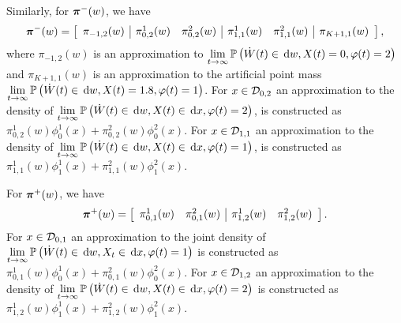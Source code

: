 Similarly, for \( {\boldsymbol\pi}^-(w)\), we have 
\[ {\boldsymbol \pi}^-(w) = \left[\begin{array}{c|cc|cc|c} {\pi}_{-1,2}(w) &  {\pi}_{0,2}^1(w) &  {\pi}_{0,2}^2(w) &  {\pi}_{1,1}^1(w) &  {\pi}_{1,1}^2(w) &  {\pi}_{K+1,1}(w) \end{array}\right],\]
where \( {\pi}_{-1,2}(w)\) is an approximation to \( \lim\limits_{t\to\infty}\mathbb{P}\left(  \dot W(t)\in\, \mathrm{d} w, X(t) =0, \varphi({t}) = 2\right)\) and \( {\pi}_{K+1,1}(w)\) is an approximation to the artificial point mass \( \lim\limits_{t\to\infty}\mathbb{P}\left( \dot W(t)\in \, \mathrm{d} w, X(t) =1.8, \varphi({t}) = 1\right)\). For \(x\in\mathcal{D}_{0,2}\) an approximation to the density of \( \lim\limits_{t\to\infty}\mathbb{P}\left(\dot W(t) \in \, \mathrm{d} w, X(t) \in \, \mathrm{d} x, \varphi({t}) = 2\right)\), is constructed as \( {\pi}_{0,2}^1(w)\phi_0^1(x) +  {\pi}_{0,2}^2(w)\phi_0^2(x)\). For \(x\in\mathcal{D}_{1,1}\) an approximation to the density of \( \lim\limits_{t\to\infty}\mathbb{P}\left( \dot W(t) \in \, \mathrm{d} w, X(t) \in \, \mathrm{d} x, \varphi({t}) = 1\right)\), is constructed as \( {\pi}_{1,1}^1(w)\phi_1^1(x) +  {\pi}_{1,1}^2(w)\phi_1^2(x).\)

For \( {\boldsymbol\pi}^+(w)\), we have 
\[ {\boldsymbol \pi}^+(w) = \left[\begin{array}{cc|cc}  {\pi}_{0,1}^1(w) &  {\pi}_{0,1}^2(w) &  {\pi}_{1,2}^1(w) &  {\pi}_{1,2}^2(w) \end{array}\right].\]
For \(x\in\mathcal{D}_{0,1}\) an approximation to the joint density of \( \lim\limits_{t\to\infty}\mathbb{P}\left(\dot W(t) \in \, \mathrm{d} w, X_t \in \, \mathrm{d} x, \varphi({t}) = 1\right)\) is constructed as \( {\pi}_{0,1}^1(w)\phi_0^1(x) +  {\pi}_{0,1}^2(w)\phi_0^2(x)\). For \(x\in\mathcal{D}_{1,2}\) an approximation to the density of \( \lim\limits_{t\to\infty}\mathbb{P}\left(\dot W(t) \in \, \mathrm{d} w,  X(t) \in \, \mathrm{d} x, \varphi({t}) = 2\right)\) is constructed as \( {\pi}_{1,2}^1(w)\phi_1^1(x) +  {\pi}_{1,2}^2(w)\phi_1^2(x).\)


